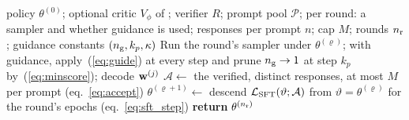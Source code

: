 \begin{algorithm}[H]
\caption{Amortization loop (with optional critic-guided sampling)}
\label{alg:loop}
\small
\begin{algorithmic}[1]
\REQUIRE policy $\theta^{(0)}$; optional critic $V_\phi$ of \methodSVGTwoD{}; verifier $R$; prompt pool $\mathcal P$; per round: a sampler and whether guidance is used; responses per prompt $n$; cap $M$; rounds $n_{\rm r}$; guidance constants $(n_{\rm g},k_p,\kappa)$
    \STATE Run the round's sampler under $\theta^{(\varrho)}$; with guidance, apply~(\ref{eq:guide}) at every step and prune $n_{\rm g}\to1$ at step $k_p$ by~(\ref{eq:minscore}); decode ${\mathbf{w}}^{(j)}$
  \ENDFOR
  \STATE $\mathcal A\leftarrow$ the verified, distinct responses, at most $M$ per prompt \hfill (eq.~\ref{eq:accept})
  \STATE $\theta^{(\varrho+1)}\leftarrow$ descend $\mathcal L_{\rm SFT}(\vartheta;\mathcal A)$ from $\vartheta=\theta^{(\varrho)}$ for the round's epochs \hfill (eq.~\ref{eq:sft_step})
\ENDFOR
\STATE \textbf{return} $\theta^{(n_{\rm r})}$
\end{algorithmic}
\end{algorithm}
